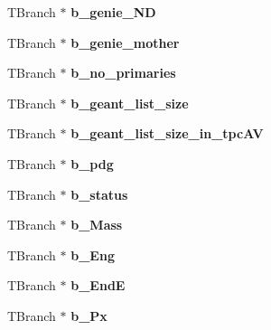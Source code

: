 \begin{DoxyCompactItemize}
\item 
\hypertarget{classanatree_aa3fba1f98f0b39993b337b87bf0505ff}{T\-Branch $\ast$ {\bfseries b\-\_\-genie\-\_\-\-N\-D}}\label{classanatree_aa3fba1f98f0b39993b337b87bf0505ff}

\item 
\hypertarget{classanatree_ac125d9de5570958ba45bda699adc76f4}{T\-Branch $\ast$ {\bfseries b\-\_\-genie\-\_\-mother}}\label{classanatree_ac125d9de5570958ba45bda699adc76f4}

\item 
\hypertarget{classanatree_a5103ef779eea8e02c35a28799adc68e2}{T\-Branch $\ast$ {\bfseries b\-\_\-no\-\_\-primaries}}\label{classanatree_a5103ef779eea8e02c35a28799adc68e2}

\item 
\hypertarget{classanatree_a93b176b810cb70bbbc3a4f3637d34ca0}{T\-Branch $\ast$ {\bfseries b\-\_\-geant\-\_\-list\-\_\-size}}\label{classanatree_a93b176b810cb70bbbc3a4f3637d34ca0}

\item 
\hypertarget{classanatree_a2fe631d23ec23018bb07c1df4dc5a086}{T\-Branch $\ast$ {\bfseries b\-\_\-geant\-\_\-list\-\_\-size\-\_\-in\-\_\-tpc\-A\-V}}\label{classanatree_a2fe631d23ec23018bb07c1df4dc5a086}

\item 
\hypertarget{classanatree_a6ce3421042e93cbabce4cf9b911493e3}{T\-Branch $\ast$ {\bfseries b\-\_\-pdg}}\label{classanatree_a6ce3421042e93cbabce4cf9b911493e3}

\item 
\hypertarget{classanatree_a487bfb75aa043108e21fded2b86bbe61}{T\-Branch $\ast$ {\bfseries b\-\_\-status}}\label{classanatree_a487bfb75aa043108e21fded2b86bbe61}

\item 
\hypertarget{classanatree_a4835ac5ebfbbd9949152d78786854fa4}{T\-Branch $\ast$ {\bfseries b\-\_\-\-Mass}}\label{classanatree_a4835ac5ebfbbd9949152d78786854fa4}

\item 
\hypertarget{classanatree_ad4dcfa13b890ce03a9227f2d1ec6ccb2}{T\-Branch $\ast$ {\bfseries b\-\_\-\-Eng}}\label{classanatree_ad4dcfa13b890ce03a9227f2d1ec6ccb2}

\item 
\hypertarget{classanatree_ab5d2fc7e9d5738fd4ac62337b5f1d46f}{T\-Branch $\ast$ {\bfseries b\-\_\-\-End\-E}}\label{classanatree_ab5d2fc7e9d5738fd4ac62337b5f1d46f}

\item 
\hypertarget{classanatree_ac76749a68f213e1d8dde5ce2c7e8e811}{T\-Branch $\ast$ {\bfseries b\-\_\-\-Px}}\label{classanatree_ac76749a68f213e1d8dde5ce2c7e8e811}


\end{DoxyCompactItemize}
